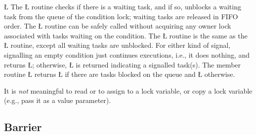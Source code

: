 \documentclass[openright,twoside]{report}
\begin{document}
\LGinlinefalse\LGbegin\lgrinde
\L{}
\endlgrinde\LGend
The \LGinlinetrue\LGbegin\lgrinde\L{}\endlgrinde\LGend{} routine checks if there is a waiting task, and if so, unblocks a waiting task from the queue of the condition lock;
waiting tasks are released in FIFO order.
The \LGinlinetrue\LGbegin\lgrinde\L{}\endlgrinde\LGend{} routine can be safely called without acquiring any owner lock associated with tasks waiting on the condition.
The \LGinlinetrue\LGbegin\lgrinde\L{}\endlgrinde\LGend{} routine is the same as the \LGinlinetrue\LGbegin\lgrinde\L{}\endlgrinde\LGend{} routine, except all waiting tasks are unblocked.
For either kind of signal, signalling an empty condition just continues executions, i.e., it does nothing, and returns \LGinlinetrue\LGbegin\lgrinde\L{}\endlgrinde\LGend{};
otherwise, \LGinlinetrue\LGbegin\lgrinde\L{}\endlgrinde\LGend{} is returned indicating a signalled task(s).
The member routine \LGinlinetrue\LGbegin\lgrinde\L{}\endlgrinde\LGend{} returns \LGinlinetrue\LGbegin\lgrinde\L{}\endlgrinde\LGend{} if there are tasks blocked on the queue and \LGinlinetrue\LGbegin\lgrinde\L{}\endlgrinde\LGend{} otherwise.

It is \emph{not} meaningful to read or to assign to a lock variable, or copy a lock variable (e.g., pass it as a value parameter).


\subsection{Barrier}
\end{document}
